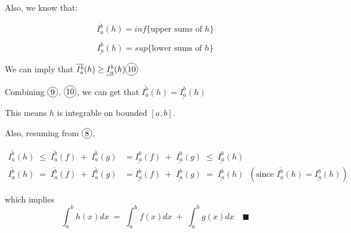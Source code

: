 \documentclass[12pt]{exam}
\newcommand*\circled[1]{\tikz[baseline=(char.base)]{
    \node[shape=circle, draw, inner sep=1pt, 
        minimum height=12pt] (char) {#1};}}
\begin{document}
\begin{enumerate}
Also, we know that:

$$
    \overline{I_a^b}(h) = inf\{\mbox{upper sums of }h\}
$$

$$
    \underline{I_a^b}(h) = sup\{\mbox{lower sums of }h\}
$$

We can imply that $\overline{I_a^b}(h) \geq \underline{I_a^b}(h) \circled{10}$

Combining $\circled{9}$, $\circled{10}$, we can get that $\overline{I_a^b}(h) = \underline{I_a^b}(h)$

This means $h$ is integrable on bounded $[a,b]$.

Also, resuming from $\circled{8}$,

\begin{align*}
    \overline{I_a^b}(h) \; \leq \; \overline{I_a^b}(f) \; + \; \overline{I_a^b}(g) &= \underline{I_a^b}(f) \; + \; \underline{I_a^b}(g) \; \leq \;  \underline{I_a^b}(h) \\
    \overline{I_a^b}(h) \; = \; \overline{I_a^b}(f) \; + \; \overline{I_a^b}(g) &= \underline{I_a^b}(f) \; + \; \underline{I_a^b}(g) \; = \;  \underline{I_a^b}(h) \; \; (\mbox{since }\overline{I_a^b}(h) = \underline{I_a^b}(h))
\end{align*}

which implies
$$
    \int_a^b h(x) dx \; = \;  \int_a^b f(x) dx \; + \; \int_a^b g(x) dx \quad\blacksquare
$$
\end{enumerate}
\end{document}
